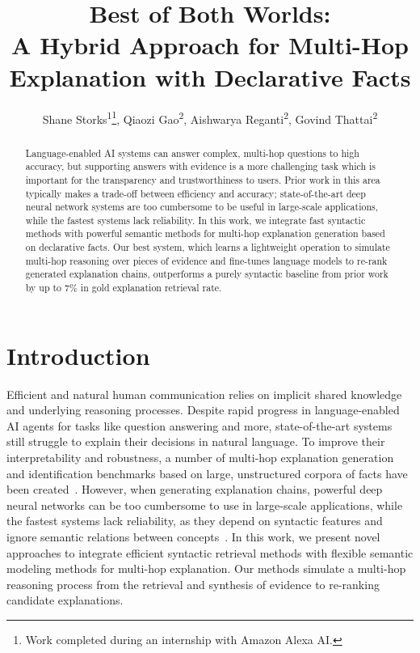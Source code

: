 \documentclass[letterpaper]{article} %
\title{Best of Both Worlds:\\A Hybrid Approach for Multi-Hop Explanation with Declarative Facts}
\author{
    Shane Storks\textsuperscript{\rm 1}\thanks{Work completed during an internship with Amazon Alexa AI.},
    Qiaozi Gao\textsuperscript{\rm 2},
    Aishwarya Reganti\textsuperscript{\rm 2},
    Govind Thattai\textsuperscript{\rm 2}
}
\begin{document}
\maketitle

\begin{abstract}
Language-enabled AI systems can answer complex, multi-hop questions to high accuracy, but supporting answers with evidence is a more challenging task which is important for the transparency and trustworthiness to users. Prior work in this area typically makes a trade-off between efficiency and accuracy; state-of-the-art deep neural network systems are too cumbersome to be useful in large-scale applications, while the fastest systems lack reliability. In this work, we integrate fast syntactic methods with powerful semantic methods for multi-hop explanation generation based on declarative facts. Our best system, which learns a lightweight operation to simulate multi-hop reasoning over pieces of evidence and fine-tunes language models to re-rank generated explanation chains, outperforms a purely syntactic baseline from prior work by up to 7\% in gold explanation retrieval rate.
\end{abstract}


\section{Introduction}

Efficient and natural human communication relies on implicit shared knowledge and underlying reasoning processes. Despite rapid progress in language-enabled AI agents for tasks like question answering and more, state-of-the-art systems still struggle to explain their decisions in natural language. To improve their interpretability and robustness, a number of multi-hop explanation generation and identification benchmarks based on large, unstructured corpora of facts have been created~\cite{mihaylov2018can,khot2020qasc,jhamtani-clark-2020-learning}. However, when generating explanation chains, powerful deep neural networks can be too cumbersome to use in large-scale applications, while the fastest systems lack reliability, as they depend on syntactic features and ignore semantic relations between concepts~\cite{banerjee2020knowledge,jhamtani-clark-2020-learning}. In this work, we present novel approaches to integrate efficient syntactic retrieval methods with flexible semantic modeling methods for multi-hop explanation. 
Our methods simulate a multi-hop reasoning process from the retrieval and synthesis of evidence to re-ranking candidate explanations.
\end{document}
